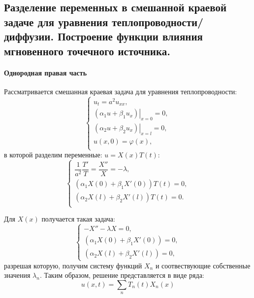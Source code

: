 \subsection{Разделение переменных в смешанной краевой задаче для уравнения теплопроводности/диффузии.
Построение функции влияния мгновенного точечного источника.}

\paragraph{Однородная правая часть} Рассматривается смешанная краевая задача для уравнения
теплопроводности:
\begin{equation}\label{1.10-main-homogeneous}
  \begin{cases}
    u_t = a^2 u_{xx}, \\
    \left. \left( \alpha_1 u + \beta_1 u_x \right) \right|_{x=0} = 0, \\
    \left. \left( \alpha_2 u + \beta_2 u_x \right) \right|_{x = l} = 0, \\
    u(x, 0) = \varphi(x), \\
  \end{cases}
\end{equation}
в которой разделим переменные: $u = X(x) T(t)$:
\[
  \begin{cases}
    \dfrac{1}{a^2} \dfrac{T'}{T} = \dfrac{X''}{X} = - \lambda, \\
    \left( \alpha_1 X(0) + \beta_1 X'(0) \right) T(t) = 0, \\
    \left( \alpha_2 X(l) + \beta_2 X'(l) \right) T(t) = 0. \\
  \end{cases}
\]

Для $X(x)$ получается такая задача:
\[
  \begin{cases}
    -X'' - \lambda X = 0, \\
    \left( \alpha_1 X(0) + \beta_1 X'(0) \right) = 0, \\
    \left( \alpha_2 X(l) + \beta_2 X'(l) \right) = 0,
  \end{cases}
\]
разрешая которую, получим систему функций $X_n$ и соотвествующие собственные значения
$\lambda_n$. Таким образом, решение представляется в виде ряда:
\[
  u(x, t) = \sum_n T_n(t) X_n(x)
\]

